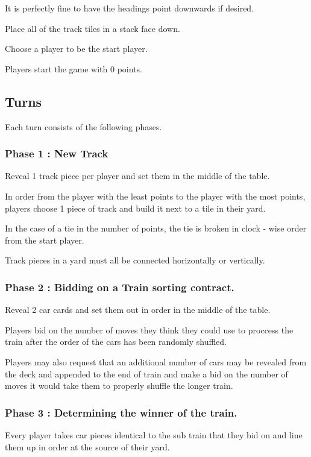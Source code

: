\documentclass[12pt, letterpaper]{article}
\begin{document}
It is perfectly fine to have the headings point downwards if desired.

Place all of the track tiles in a stack face down.

Choose a player to be the start player.

Players start the game with 0 points.

\subsection{Turns}

Each turn consists of the following phases.

\subsubsection{Phase 1 : New Track}

Reveal 1 track piece per player and set them in the middle of the table.

In order from the player with the least points to the player with the most points, players choose 1 piece of track and build it next to a tile in their yard.

In the case of a tie in the number of points, the tie is broken in clock - wise order from the start player.

Track pieces in a yard must all be connected horizontally or vertically.

\subsubsection{Phase 2 : Bidding on a Train sorting contract.}

Reveal 2 car cards and set them out in order in the middle of the table.

Players bid on the number of moves they think they could use to proccess the train after the order of the cars has been randomly shuffled.

Players may also request that an additional number of cars may be revealed from the deck and appended to the end of train and make a bid on the number of moves it would take them to properly shuffle the longer train.

\subsubsection{Phase 3 : Determining the winner of the train.}

Every player takes car pieces identical to the sub train that they bid on and line them up in order at the source of their yard.
\end{document}
